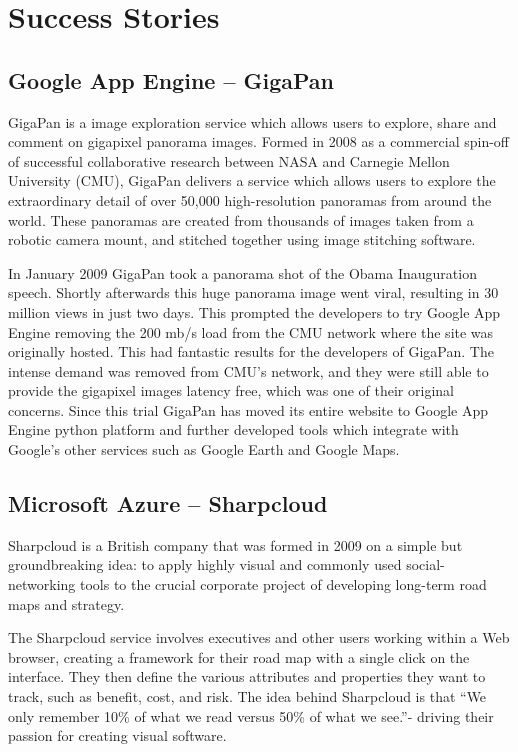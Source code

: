 \chapter{Success Stories}
\section{Google App Engine -- GigaPan}
GigaPan is a image exploration service which allows users to explore, share and comment on gigapixel panorama images. Formed in 2008 as a commercial spin-off of successful collaborative research between NASA and Carnegie Mellon University (CMU), GigaPan delivers a service which allows users to explore the extraordinary detail of over 50,000 high-resolution panoramas from around the world. These panoramas are created from thousands of images taken from a robotic camera mount, and stitched together using image stitching software\ftSgaeOne.
\ftSgaeOneText

In January 2009 GigaPan took a panorama shot of the Obama Inauguration speech. Shortly afterwards this huge panorama image went viral, resulting in 30 million views in just two days. This prompted the developers to try Google App Engine removing the 200 mb/s load from the CMU network where the site was originally hosted. This had fantastic results for the developers of GigaPan. The intense demand was removed from CMU's network, and they were still able to provide the gigapixel images latency free, which was one of their original concerns\ftSgaeTwo. Since this trial GigaPan has moved its entire website to Google App Engine python platform and further developed tools which integrate with Google's other services such as Google Earth and Google Maps\ftSgaeThree.
\ftSgaeTwoText\ftSgaeThreeText

\section{Microsoft Azure -- Sharpcloud}
Sharpcloud is a British company that was formed in 2009 on a simple but groundbreaking idea: to apply highly visual and commonly used social-networking tools to the crucial corporate project of developing long-term road maps and strategy. 

The Sharpcloud service involves executives and other users working within a Web browser, creating a framework for their road map with a single click on the interface. They then define the various attributes and properties they want to track, such as benefit, cost, and risk. The idea behind Sharpcloud is that ``We only remember 10\% of what we read versus 50\% of what we see.''\ftSAzOne - driving their passion for creating visual software.
\ftSAzOneText

